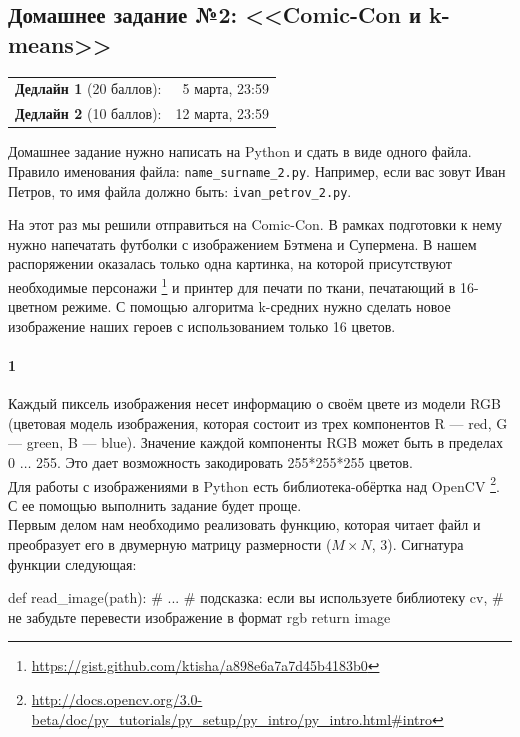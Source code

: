\documentclass[a4paper,12pt]{article}
\begin{document}
\subsection*{Домашнее задание №2: <<Comic-Con и k-means>>}

\begin{tabular}{@{}lr}
  \textbf{Дедлайн 1} (20 баллов): & 5 марта, 23:59 \\
  \textbf{Дедлайн 2} (10 баллов): & 12 марта, 23:59
\end{tabular}

Домашнее задание нужно написать на Python и сдать в виде одного файла.
Правило именования файла: \texttt{name\_surname\_2.py}. Например, если
вас зовут Иван Петров, то имя файла должно быть: \texttt{ivan\_petrov\_2.py}.

\makebox[\linewidth]{\hrulefill}

На этот раз мы решили отправиться на Comic-Con. В рамках подготовки к нему нужно напечатать футболки с изображением Бэтмена и Супермена. В нашем распоряжении оказалась только одна картинка, на которой присутствуют необходимые персонажи%
\footnote{\url{https://gist.github.com/ktisha/a898e6a7a7d45b4183b0}} и принтер для печати по ткани, печатающий в 16-цветном режиме. С помощью алгоритма k-средних нужно сделать новое изображение наших героев с использованием только 16 цветов.

\paragraph{1} Каждый пиксель изображения несет информацию о своём цвете из модели RGB (цветовая модель изображения, которая состоит из трех компонентов R — red, G — green, B — blue). Значение каждой компоненты RGB может быть в пределах 0 $\dots $ 255. Это дает возможность закодировать 255*255*255 цветов.\\ 
Для работы с изображениями в Python есть библиотека-обёртка над OpenCV \footnote{\url{http://docs.opencv.org/3.0-beta/doc/py\_tutorials/py\_setup/py\_intro/py\_intro.html\#intro}}. С ее помощью выполнить задание будет проще.\\
Первым делом нам необходимо реализовать функцию, которая читает файл и преобразует его в двумерную матрицу  размерности ($M \times N	$, 3). 
Сигнатура функции следующая:
\begin{python3}
def read_image(path):
    # ...
    # подсказка: если вы используете библиотеку cv, 
    # не забудьте перевести изображение в формат rgb
    return image
\end{python3}
\end{document}
